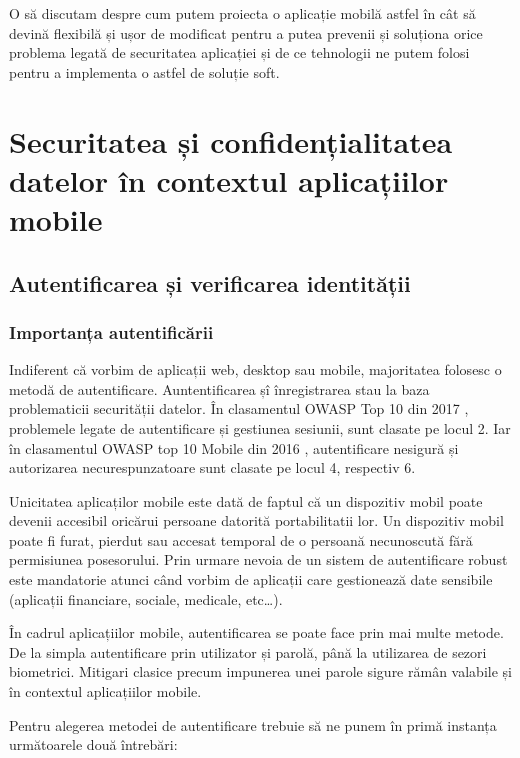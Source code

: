 \documentclass[12pt]{article}
\begin{document}
O să discutam despre cum putem proiecta o aplicație mobilă astfel în cât
să devină flexibilă și ușor de modificat pentru a putea prevenii și soluționa orice
problema legată de securitatea aplicației și de ce tehnologii ne putem 
folosi pentru a implementa o astfel de soluție soft.


\newpage
\section{Securitatea și confidențialitatea datelor în contextul aplicațiilor mobile}
\subsection{Autentificarea și verificarea identității}
\subsubsection{Importanța autentificării}

Indiferent că vorbim de aplicații web, desktop sau mobile, majoritatea folosesc 
o metodă de autentificare. Auntentificarea șî înregistrarea stau la baza
problematicii securității datelor. În clasamentul OWASP Top 10 din 2017 \cite{owasp-top10-2017}, 
problemele legate de autentificare și gestiunea sesiunii, sunt clasate pe locul 2. Iar în
clasamentul OWASP top 10 Mobile din 2016 \cite{owasp-top10-mobile}, autentificare nesigură
și autorizarea necurespunzatoare sunt clasate pe locul 4, respectiv 6.

Unicitatea aplicaților mobile este dată de faptul că un dispozitiv mobil
poate devenii accesibil oricărui persoane datorită portabilitatii lor. Un dispozitiv mobil
poate fi furat, pierdut sau accesat temporal de o persoană necunoscută fără permisiunea
posesorului. Prin urmare nevoia de un sistem de autentificare robust este mandatorie 
atunci când vorbim de aplicații care gestionează date sensibile (aplicații financiare, sociale,
medicale, etc\dots).

\bigskip

În cadrul aplicațiilor mobile, autentificarea se poate face prin mai multe metode. De la
simpla autentificare prin utilizator și parolă, până la utilizarea de sezori biometrici.
Mitigari clasice precum impunerea unei parole sigure rămân valabile și în 
contextul aplicațiilor mobile.


Pentru alegerea metodei de autentificare trebuie să ne punem în primă instanța următoarele două
întrebări:
\end{document}
